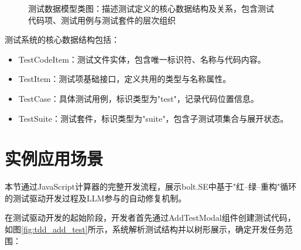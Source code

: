 \begin{figure}
  \centering
  \caption{测试数据模型类图：描述测试定义的核心数据结构及关系，包含测试代码项、测试用例与测试套件的层次组织}
  \label{fig:test_class}
\end{figure}

测试系统的核心数据结构包括：

\begin{itemize}
  \item TestCodeItem：测试文件实体，包含唯一标识符、名称与代码内容。
  
  \item TestItem：测试项基础接口，定义共用的类型与名称属性。
  
  \item TestCase：具体测试用例，标识类型为"test"，记录代码位置信息。
  
  \item TestSuite：测试套件，标识类型为"suite"，包含子测试项集合与展开状态。
\end{itemize}

\section{实例应用场景}
\label{sec:tdd-example}

本节通过JavaScript计算器的完整开发流程，展示bolt.SE中基于"红–绿–重构"循环的测试驱动开发过程及LLM参与的自动修复机制。

在测试驱动开发的起始阶段，开发者首先通过AddTestModal组件创建测试代码，如图\ref{fig:tdd_add_test}所示，系统解析测试结构并以树形展示，确定开发任务范围：

